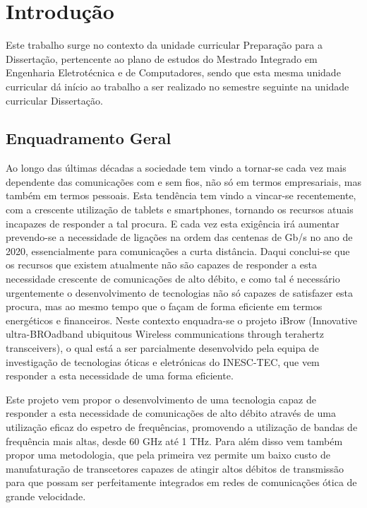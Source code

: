 \chapter{Introdução} \label{chap:intro}

Este trabalho surge no contexto da unidade curricular Preparação para a Dissertação, pertencente ao plano de estudos do Mestrado Integrado em Engenharia Eletrotécnica e de Computadores, sendo que esta mesma unidade curricular dá início ao trabalho a ser realizado no semestre seguinte na unidade curricular Dissertação.


\section{Enquadramento Geral} \label{sec:context}
Ao longo das últimas décadas a sociedade tem vindo a tornar-se cada vez mais dependente das comunicações com e sem fios, não só em termos empresariais, mas também em termos pessoais. Esta tendência tem vindo a vincar-se recentemente, com a crescente utilização de tablets e smartphones, tornando os recursos atuais incapazes de responder a tal procura. E cada vez esta exigência irá aumentar prevendo-se a necessidade de ligações na ordem das centenas de Gb/s no ano de 2020, essencialmente para comunicações a curta distância. Daqui conclui-se que os recursos que existem atualmente não são capazes de responder a esta necessidade crescente de comunicações de alto débito, e como tal é necessário urgentemente o desenvolvimento de tecnologias não só capazes de satisfazer esta procura, mas ao mesmo tempo que o façam de forma eficiente em termos energéticos e financeiros. Neste contexto enquadra-se o projeto iBrow (Innovative ultra-BROadband ubiquitous Wireless communications through terahertz transceivers), o qual está a ser parcialmente desenvolvido pela equipa de investigação de tecnologias óticas e eletrónicas do INESC-TEC, que vem responder a esta necessidade de uma forma eficiente.

 Este projeto vem propor o desenvolvimento de uma tecnologia capaz de responder a esta necessidade de comunicações de alto débito através de uma utilização eficaz do espetro de frequências, promovendo a utilização de bandas de frequência mais altas, desde 60 GHz até 1 THz. Para além disso vem também propor uma metodologia, que pela primeira vez permite um baixo custo de manufaturação de transcetores capazes de atingir altos débitos de transmissão para que possam ser perfeitamente integrados em redes de comunicações ótica de grande velocidade.
 
